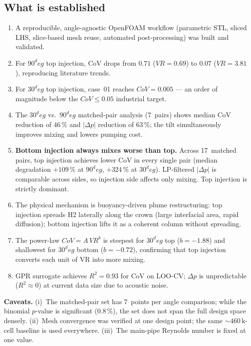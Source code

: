 \documentclass[10pt,a4paper]{article}
\def\Hi{H2}%
\def\VR{VR}%
\def\CoV{CoV}%
\def\circ{ deg}%
\newcommand{\Hi}{\ensuremath{\mathrm{H_2}}}
\newcommand{\VR}{\ensuremath{\mathrm{VR}}}
\newcommand{\CoV}{\ensuremath{\mathrm{CoV}}}
\begin{document}
\subsection{What is established}
\begin{enumerate}
    \item A reproducible, angle-agnostic OpenFOAM workflow
    (parametric STL, sliced LHS, slice-based mesh reuse,
    automated post-processing) was built and validated.
    \item For \(90^\circ\) top injection, \CoV{} drops from
    \(0.71\) (\(\VR=0.69\)) to \(0.07\) (\(\VR=3.81\)),
    reproducing literature trends.
    \item For \(30^\circ\) top injection, case~01 reaches
    \(\CoV=0.005\) --- an order of magnitude below the
    \(\CoV\le 0.05\) industrial target.
    \item The \(30^\circ\) vs.\ \(90^\circ\) matched-pair analysis
    (7~pairs) shows median \CoV{} reduction of \(46\,\%\) and
    \(|\Delta p|\) reduction of \(63\,\%\); the tilt
    simultaneously improves mixing and lowers pumping cost.
    \item \textbf{Bottom injection always mixes worse than top.}
    Across 17~matched pairs, top injection achieves lower \CoV{}
    in every single pair (median degradation \(+109\,\%\) at
    \(90^\circ\), \(+324\,\%\) at \(30^\circ\)).  LP-filtered
    \(|\Delta p|\) is comparable across sides, so injection side
    affects only mixing.  Top injection is strictly dominant.
    \item The physical mechanism is buoyancy-driven plume
    restructuring: top injection spreads \Hi{} laterally along the
    crown (large interfacial area, rapid diffusion); bottom
    injection lifts it as a coherent column without spreading.
    \item The power-law \(\CoV=A\,\VR^{b}\) is steepest for
    \(30^\circ\) top (\(b=-1.88\)) and shallowest for
    \(30^\circ\) bottom (\(b=-0.72\)), confirming that top
    injection converts each unit of \VR{} into more mixing.
    \item GPR surrogate achieves \(R^{2}=0.93\) for \CoV{} on
    LOO-CV; \(\Delta p\) is unpredictable (\(R^{2}\approx 0\))
    at current data size due to acoustic noise.
\end{enumerate}

\noindent\textbf{Caveats.}
(i)~The matched-pair set has 7~points per angle comparison;
while the binomial \(p\)-value is significant (\(0.8\,\%\)),
the set does not span the full design space densely.
(ii)~Mesh convergence was verified at one design point; the same
\(\sim\!460\,\mathrm{k}\)-cell baseline is used everywhere.
(iii)~The main-pipe Reynolds number is fixed at one value.
\end{document}
